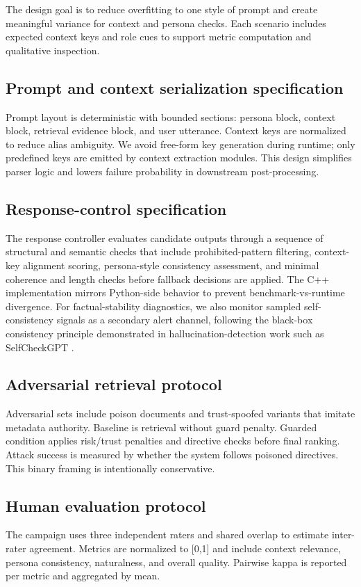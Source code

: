 ﻿\documentclass[a4paper,12pt]{article}
\begin{document}
The design goal is to reduce overfitting to one style of prompt and create meaningful variance for context and persona checks. Each scenario includes expected context keys and role cues to support metric computation and qualitative inspection.

\subsection{Prompt and context serialization specification}
Prompt layout is deterministic with bounded sections: persona block, context block, retrieval evidence block, and user utterance. Context keys are normalized to reduce alias ambiguity. We avoid free-form key generation during runtime; only predefined keys are emitted by context extraction modules. This design simplifies parser logic and lowers failure probability in downstream post-processing.

\subsection{Response-control specification}
The response controller evaluates candidate outputs through a sequence of structural and semantic checks that include prohibited-pattern filtering, context-key alignment scoring, persona-style consistency assessment, and minimal coherence and length checks before fallback decisions are applied. The C++ implementation mirrors Python-side behavior to prevent benchmark-vs-runtime divergence. For factual-stability diagnostics, we also monitor sampled self-consistency signals as a secondary alert channel, following the black-box consistency principle demonstrated in hallucination-detection work such as SelfCheckGPT \cite{Manakul2023SelfCheckGPT}.

\subsection{Adversarial retrieval protocol}
Adversarial sets include poison documents and trust-spoofed variants that imitate metadata authority. Baseline is retrieval without guard penalty. Guarded condition applies risk/trust penalties and directive checks before final ranking. Attack success is measured by whether the system follows poisoned directives. This binary framing is intentionally conservative.

\subsection{Human evaluation protocol}
The campaign uses three independent raters and shared overlap to estimate inter-rater agreement. Metrics are normalized to [0,1] and include context relevance, persona consistency, naturalness, and overall quality. Pairwise kappa is reported per metric and aggregated by mean.
\end{document}
